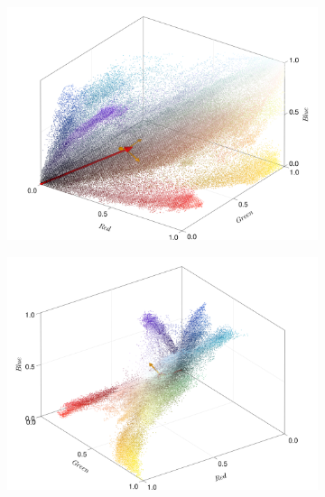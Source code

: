 \begin{figure}[ht!]
    \centering
    \begin{subfigure}[c]{0.3\textwidth}
        \centering
        \includegraphics[scale=0.09]{../pictures/pixel_cloud_kids_1}
    \end{subfigure}
    \begin{subfigure}[c]{0.3\textwidth}
        \centering
        \includegraphics[scale=0.09]{../pictures/pixel_cloud_kids_2}
    \end{subfigure}
    \begin{subfigure}[c]{0.3\textwidth}
        \centering

\end{subfigure}
\end{figure}
